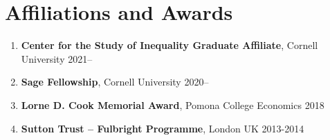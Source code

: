 \documentclass[letterpaper,11pt,oneside]{article}
\begin{document}
\section*{Affiliations and Awards}
\begin{enumerate}[itemsep=2pt, label={}]
    \item \textbf{Center for the Study of Inequality Graduate Affiliate}, Cornell University 2021--
    \item \textbf{Sage Fellowship}, Cornell University 2020--
    \item \textbf{Lorne D. Cook Memorial Award}, Pomona College Economics 2018
    \item \textbf{Sutton Trust -- Fulbright Programme}, London UK 2013-2014  
\end{enumerate}
\end{document}

